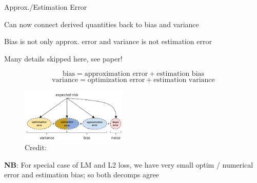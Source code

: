 \documentclass[11pt,compress,t,notes=noshow, xcolor=table]{beamer}
\begin{document}
\begin{vbframe}{Approx./Estimation Error }

\begin{itemizeM}

\item Can now connect derived quantities back to bias and variance 
\item Bias is not only approx. error and variance is not estimation error
\item Many details skipped here, see paper!

$$ \text{bias} = \text{approximation error} + \text{estimation bias} $$
$$\text{variance} = \text{optimization error} + \text{estimation variance}$$

\begin{figure}
    \centering
    \includegraphics[width = 0.45\textwidth]{figure_man/expected-risk-decomp.png}
    \tiny{\\ Credit: \cite{BROWN2024BIAS}}
  \end{figure}

\item \textbf{NB}: For special case of LM and L2 loss, we have very small optim / numerical error and estimation bias; so both decomps agree

\end{itemizeM}

\end{vbframe}

\endlecture
\end{document}
